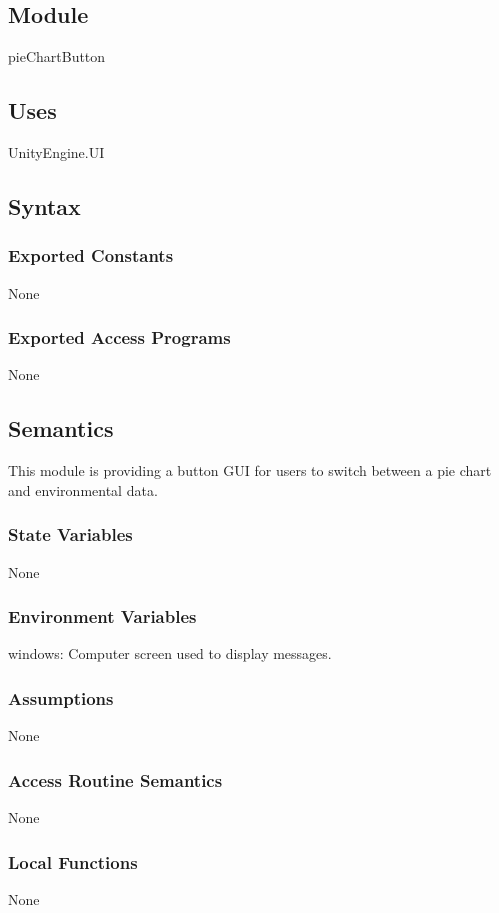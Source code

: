 \documentclass[12pt, titlepage]{article}
\begin{document}
\subsection{Module}
pieChartButton

\subsection{Uses}
UnityEngine.UI

\subsection{Syntax}

\subsubsection{Exported Constants}
None
\subsubsection{Exported Access Programs}
None

\subsection{Semantics}
This module is providing a button GUI for users to switch between a pie chart and environmental
data.

\subsubsection{State Variables}
None

\subsubsection{Environment Variables}

windows: Computer screen used to display messages.

\subsubsection{Assumptions}

None

\subsubsection{Access Routine Semantics}
None

\subsubsection{Local Functions}
None
\end{document}
